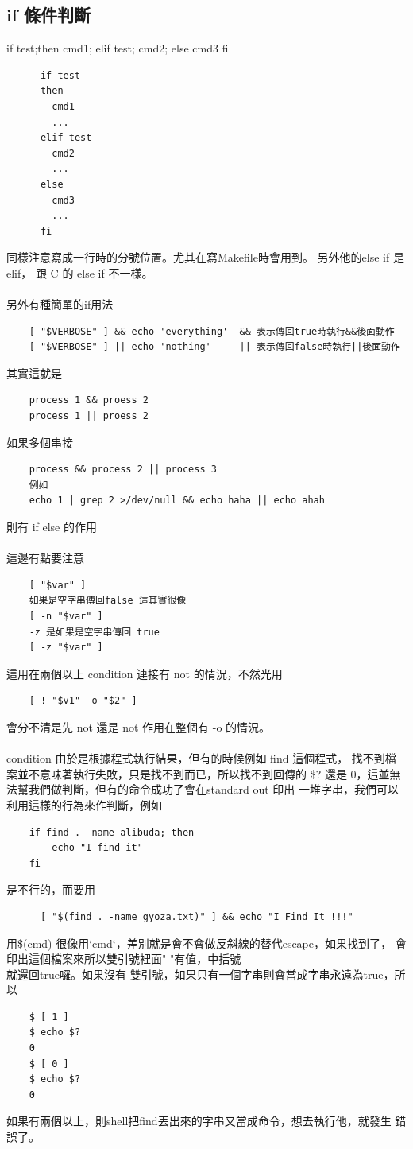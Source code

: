     \subsection{if 條件判斷}
    if test;then cmd1; elif test; cmd2; else cmd3 fi
    \begin{verbatim}
      if test
      then
        cmd1
        ...
      elif test
        cmd2
        ...
      else
        cmd3
        ...
      fi
    \end{verbatim}
    同樣注意寫成一行時的分號位置。尤其在寫Makefile時會用到。
    另外他的else if 是 elif， 跟 C 的 else if 不一樣。
    \\\\
    另外有種簡單的if用法
    \begin{verbatim}
    [ "$VERBOSE" ] && echo 'everything'  && 表示傳回true時執行&&後面動作
    [ "$VERBOSE" ] || echo 'nothing'     || 表示傳回false時執行||後面動作
    \end{verbatim}
    其實這就是
    \begin{verbatim}
    process 1 && proess 2
    process 1 || proess 2
    \end{verbatim}
    如果多個串接
    \begin{verbatim}
    process && process 2 || process 3
    例如
    echo 1 | grep 2 >/dev/null && echo haha || echo ahah
    \end{verbatim}
    則有 if else 的作用
    \\\\
    這邊有點要注意
    \begin{verbatim}
    [ "$var" ]
    如果是空字串傳回false 這其實很像
    [ -n "$var" ]
    -z 是如果是空字串傳回 true
    [ -z "$var" ] 
    \end{verbatim}
    這用在兩個以上 condition 連接有 not 的情況，不然光用 
    \begin{verbatim}
    [ ! "$v1" -o "$2" ]
    \end{verbatim}
    會分不清是先 not 還是 not 作用在整個有 -o 的情況。
    \\\\
    condition 由於是根據程式執行結果，但有的時候例如 find 這個程式，
    找不到檔案並不意味著執行失敗，只是找不到而已，所以找不到回傳的 \$?
    還是 0，這並無法幫我們做判斷，但有的命令成功了會在standard out 印出
    一堆字串，我們可以利用這樣的行為來作判斷，例如
    \begin{verbatim}
    if find . -name alibuda; then
        echo "I find it"
    fi
    \end{verbatim}
    是不行的，而要用
    \begin{verbatim}
      [ "$(find . -name gyoza.txt)" ] && echo "I Find It !!!"
    \end{verbatim}
    用\$(cmd) 很像用`cmd`，差別就是會不會做反斜線的替代escape，如果找到了，
    會印出這個檔案來所以雙引號裡面" "有值，中括號\[ \]就還回true囉。如果沒有
    雙引號，如果只有一個字串則會當成字串永遠為true，所以
    \begin{verbatim}
    $ [ 1 ]
    $ echo $?
    0
    $ [ 0 ]
    $ echo $?
    0
    \end{verbatim}
    如果有兩個以上，則shell把find丟出來的字串又當成命令，想去執行他，就發生
    錯誤了。
